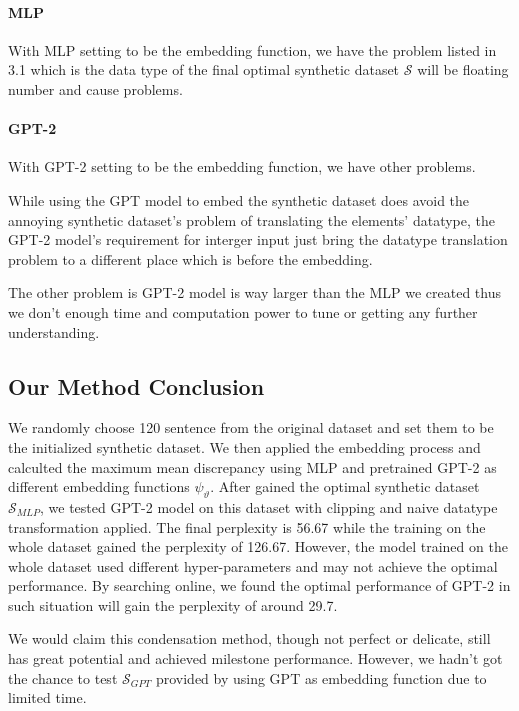 \documentclass{article}
\begin{document}
\paragraph{MLP}
With MLP setting to be the embedding function, we have the problem listed in 3.1 which is the data type of the final optimal synthetic dataset $\mathcal{S}$ will be floating number and cause problems.

\paragraph{GPT-2}
With GPT-2 setting to be the embedding function, we have other problems.

While using the GPT model to embed the synthetic dataset does avoid the annoying synthetic dataset's problem of translating the elements' datatype, the GPT-2 model's requirement for interger input just bring the datatype translation problem to a different place which is before the embedding. 

The other problem is GPT-2 model is way larger than the MLP we created thus we don't enough time and computation power to tune or getting any further understanding.


\subsection{Our Method Conclusion}

We randomly choose 120 sentence from the original dataset and set them to be the initialized synthetic dataset. We then applied the embedding process and calculted the maximum mean discrepancy using MLP and pretrained GPT-2 as different embedding functions $\psi_{\vartheta}$. After gained the optimal synthetic dataset $\mathcal{S}_{MLP}$, we tested GPT-2 model on this dataset with clipping and naive datatype transformation applied. The final perplexity is 56.67 while the training on the whole dataset gained the perplexity of 126.67. However, the model trained on the whole dataset used different hyper-parameters and may not achieve the optimal performance. By searching online, we found the optimal performance of GPT-2 in such situation will gain the perplexity of around 29.7.

We would claim this condensation method, though not perfect or delicate, still has great potential and achieved milestone performance. However, we hadn't got the chance to test $\mathcal{S}_{GPT}$ provided by using GPT as embedding function due to limited time.
\end{document}
